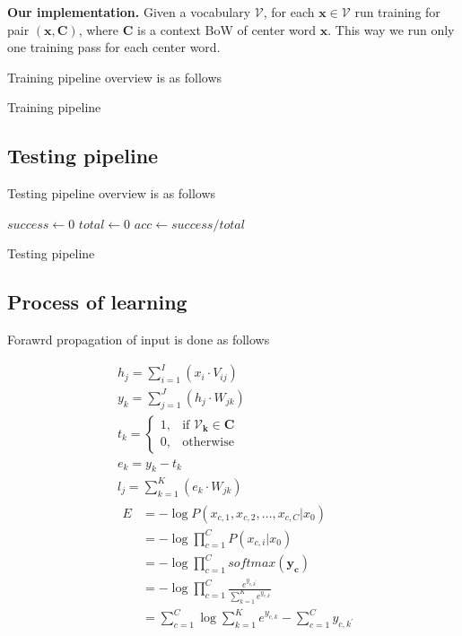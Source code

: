 \documentclass{article}
\newcommand{\SetAlgoStyle}{
	\SetAlgoNoLine
	\SetAlgoNoEnd
	\DontPrintSemicolon
}
\begin{document}
\textbf{Our implementation.}
Given a vocabulary $\mathcal{V}$, for each $\boldsymbol{x} \in \mathcal{V}$ run training for pair $(\boldsymbol{x}, \boldsymbol{C})$, where $\boldsymbol{C}$ is a context BoW of center word $\boldsymbol{x}$. This way we run only one training pass for each center word.

Training pipeline overview is as follows

\begin{algorithm}[H]
	\SetAlgoStyle
	\caption{Training pipeline}
\end{algorithm}

\subsection{Testing pipeline}

Testing pipeline overview is as follows

\begin{algorithm}[H]
	\SetAlgoStyle
	$success \gets 0$\;
	$total \gets 0$\;
	$acc \gets success / total$\;
	\caption{Testing pipeline}
\end{algorithm}

\subsection{Process of learning}

Forawrd propagation of input is done as follows

\begin{align}
	&h_j = \sum_{i=1}^I (x_i \cdot V_{ij}) \\
	&y_k = \sum_{j=1}^J (h_j \cdot W_{jk}) \\
	&t_k =
	\begin{cases}
		1, &\text{if } \boldsymbol{\mathcal{V}_k} \in \boldsymbol{C} \\
		0, &\text{otherwise}
	\end{cases} \\
	&e_k = y_k - t_k \\
	&l_j = \sum_{k=1}^K (e_k \cdot W_{jk}) \\
	&\begin{aligned}
		E &= -\log P(x_{c,1}, x_{c,2},\ldots,x_{c,C}|x_0) \\
		&= -\log \prod_{c=1}^C P(x_{c,i}|x_0) \\
		&= -\log \prod_{c=1}^C softmax(\boldsymbol{y_c}) \\
		&= -\log \prod_{c=1}^C \frac{e^{y_{c,k^\prime}}}{\sum_{k=1}^K e^{y_{c,k}}} \\
		&= \sum_{c=1}^C \log\sum_{k=1}^K e^{y_{c,k}} - \sum_{c=1}^C y_{c,k^\prime}
	\end{aligned}
\end{align}
\end{document}
